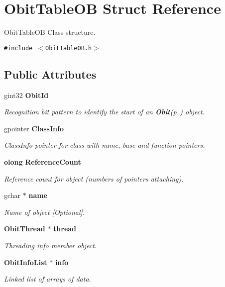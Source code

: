 \section{Obit\-Table\-OB Struct Reference}
\label{structObitTableOB}
Obit\-Table\-OB Class structure.  


{\tt \#include $<$Obit\-Table\-OB.h$>$}

\subsection*{Public Attributes}
\begin{CompactItemize}
\item 
gint32 {\bf Obit\-Id}
\begin{CompactList}\small\item\em Recognition bit pattern to identify the start of an {\bf Obit}{\rm (p.\,\pageref{structObit})} object. \item\end{CompactList}\item 
gpointer {\bf Class\-Info}
\begin{CompactList}\small\item\em Class\-Info pointer for class with name, base and function pointers. \item\end{CompactList}\item 
{\bf olong} {\bf Reference\-Count}
\begin{CompactList}\small\item\em Reference count for object (numbers of pointers attaching). \item\end{CompactList}\item 
gchar $\ast$ {\bf name}
\begin{CompactList}\small\item\em Name of object [Optional]. \item\end{CompactList}\item 
{\bf Obit\-Thread} $\ast$ {\bf thread}
\begin{CompactList}\small\item\em Threading info member object. \item\end{CompactList}\item 
{\bf Obit\-Info\-List} $\ast$ {\bf info}
\begin{CompactList}\small\item\em Linked list of arrays of data. \item\end{CompactList}\item 

\end{CompactItemize}
